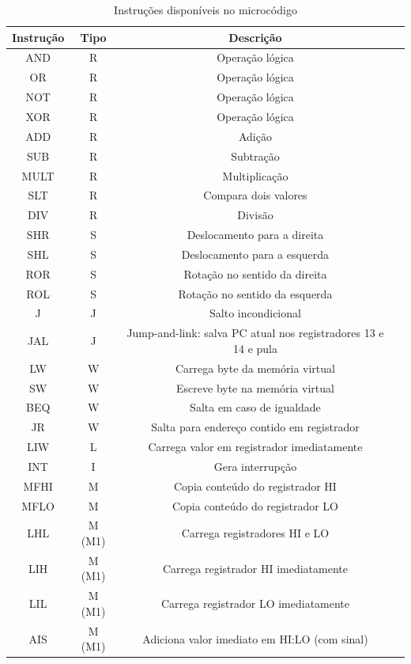 \documentclass[11pt]{report}
\begin{document}
\begin{table}[H]
\caption{Instruções disponíveis no microcódigo}
\label{tab:inst}
\begin{tabular}{c c c c}
\hline
Instrução	&	Tipo		&	Descrição\\
\hline
AND			&	R		&	Operação lógica\\
OR			&	R		&	Operação lógica\\
NOT			&	R		&	Operação lógica\\
XOR			&	R		&	Operação lógica\\
ADD			&	R		&	Adição\\
SUB			&	R		&	Subtração\\
MULT			&	R		&	Multiplicação\\
SLT			&	R		&	Compara dois valores\\
DIV			&	R		&	Divisão\\
\hline
SHR			&	S		&	Deslocamento para a direita\\
SHL			&	S		&	Deslocamento para a esquerda\\
ROR			&	S		&	Rotação no sentido da direita\\
ROL			&	S		&	Rotação no sentido da esquerda\\
\hline
J			&	J		&	Salto incondicional\\
JAL			&	J		&	Jump-and-link: salva PC atual nos registradores 13 e 14 e pula\\
\hline
LW			&	W		&	Carrega byte da memória virtual\\
SW			&	W		&	Escreve byte na memória virtual\\
BEQ			&	W		&	Salta em caso de igualdade\\
JR			&	W		&	Salta para endereço contido em registrador\\
\hline
LIW			&	L		&	Carrega valor em registrador imediatamente\\
\hline
INT			&	I		&	Gera interrupção\\
\hline
MFHI			&	M		&	Copia conteúdo do registrador HI\\
MFLO			&	M		&	Copia conteúdo do registrador LO\\
LHL			&	M (M1)	&	Carrega registradores HI e LO\\
LIH			&	M (M1)	&	Carrega registrador HI imediatamente\\
LIL			&	M (M1)	&	Carrega registrador LO imediatamente\\
AIS			&	M (M1)	&	Adiciona valor imediato em HI:LO (com sinal)\\
\end{tabular}
\end{table}
\end{document}
